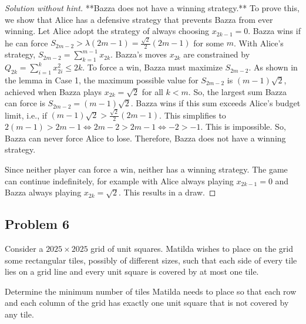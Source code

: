 \begin{proof} [Solution without hint]
**Bazza does not have a winning strategy.**
To prove this, we show that Alice has a defensive strategy that prevents Bazza from ever winning. Let Alice adopt the strategy of always choosing $x_{2k-1}=0$.
Bazza wins if he can force $S_{2m-2} > \lambda(2m-1) = \frac{\sqrt{2}}{2}(2m-1)$ for some $m$.
With Alice's strategy, $S_{2m-2} = \sum_{k=1}^{m-1} x_{2k}$. Bazza's moves $x_{2k}$ are constrained by $Q_{2k} = \sum_{i=1}^k x_{2i}^2 \le 2k$.
To force a win, Bazza must maximize $S_{2m-2}$. As shown in the lemma in Case 1, the maximum possible value for $S_{2m-2}$ is $(m-1)\sqrt{2}$, achieved when Bazza plays $x_{2k}=\sqrt{2}$ for all $k<m$.
So, the largest sum Bazza can force is $S_{2m-2}=(m-1)\sqrt{2}$. Bazza wins if this sum exceeds Alice's budget limit, i.e., if $(m-1)\sqrt{2} > \frac{\sqrt{2}}{2}(2m-1)$. This simplifies to $2(m-1) > 2m-1 \iff 2m-2 > 2m-1 \iff -2 > -1$. This is impossible.
So, Bazza can never force Alice to lose. Therefore, Bazza does not have a winning strategy.

Since neither player can force a win, neither has a winning strategy. The game can continue indefinitely, for example with Alice always playing $x_{2k-1}=0$ and Bazza always playing $x_{2k}=\sqrt{2}$. This results in a draw.
\end{proof}

\subsection{Problem 6} \label{a:6}

\begin{problem}
Consider a $2025 \times 2025$ grid of unit squares. Matilda wishes to place on the grid some rectangular tiles, possibly of different sizes, such that each side of every tile lies on a grid line and every unit square is covered by at most one tile.

Determine the minimum number of tiles Matilda needs to place so that each row and each column of the grid has exactly one unit square that is not covered by any tile.
\end{problem}

